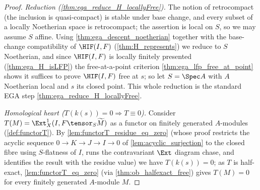 \begin{theorem}
  \begin{proof}
    \emph{Reduction (\cref{thm:ega_reduce_H_locallyFree}).} The notion of
    retrocompact (the inclusion is quasi-compact) is stable under base change, and
    every subset of a locally Noetherian space is retrocompact; the assertion is
    local on $S$, so we may assume $S$ affine. Using \cref{thm:ega_descent_noetherian}
    together with the base-change compatibility of $\HIF(I,F)$
    (\cref{thm:H_represents}) we reduce to $S$ Noetherian, and since $\HIF(I,F)$ is
    locally finitely presented (\cref{thm:ega_H_isLFP}) the free-at-a-point criterion
    \cref{thm:ega_lfp_free_at_point} shows it suffices to prove $\HIF(I,F)$ free at
    $s$; so let $S = \Spec A$ with $A$ Noetherian local and $s$ its closed point.
    This whole reduction is the standard EGA step \cref{thm:ega_reduce_H_locallyFree}.

    \emph{Homological heart ($T(k(s)) = 0 \Rightarrow T \equiv 0$).} Consider
    $T(M) = \Ext^1_X(I, F \tensor_S \widetilde M)$ as a functor on finitely
    generated $A$-modules (\cref{def:functorT}). By \cref{lem:functorT_residue_eq_zero}
    (whose proof restricts the acyclic sequence $0 \to K \to J \to I \to 0$ of
    \cref{lem:acyclic_surjection} to the closed fibre using $S$-flatness of $I$,
    runs the contravariant $\Ext$ diagram chase, and identifies the result with the
    residue value) we have $T(k(s)) = 0$; as $T$ is half-exact,
    \cref{lem:functorT_eq_zero} (via \cref{thm:ob_halfexact_free}) gives $T(M) = 0$
    for every finitely generated $A$-module $M$.


\end{proof}
\end{theorem}
